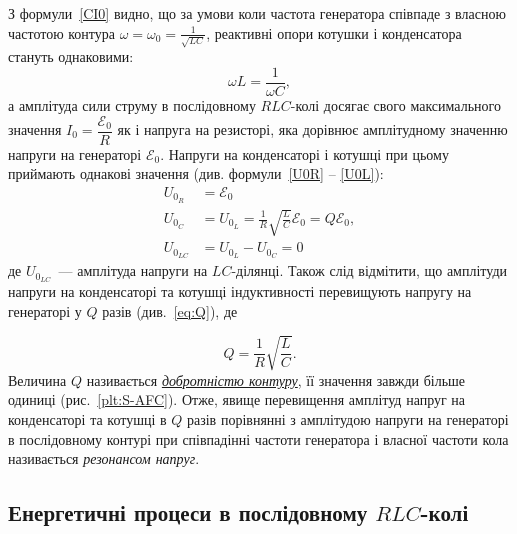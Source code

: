 З формули~\eqref{CI0} видно, що за умови коли частота генератора співпаде з власною частотою контура $\omega = \omega_0 = \frac{1}{\sqrt{LC}}$, реактивні опори котушки і конденсатора стануть однаковими:
\begin{equation}
	\omega L = \frac{1}{\omega C},
\end{equation}
а амплітуда сили струму в послідовному $RLC$-колі досягає свого максимального значення $I_0 = \dfrac{\mathcal{E}_0}{R}$ як і напруга на резисторі, яка дорівнює амплітудному значенню напруги на генераторі $\mathcal{E}_0$. Напруги на конденсаторі і котушці при цьому приймають однакові значення (див. формули~\eqref{U0R} -- \eqref{U0L}):
\begin{align}\label{ULC}
	U_{0_R}    & = \mathcal{E}_0                                                             \\
	U_{0_C}    & = U_{0_L} = \frac{1}{R} \sqrt{\frac{L}{C}} \mathcal{E}_0 = Q \mathcal{E}_0, \label{eq:Q}\\
	U_{0_{LC}} & = U_{0_L} - U_{0_C} = 0 
\end{align}
де $U_{0_{LC}}$~--- амплітуда напруги на $LC$-ділянці. Також слід відмітити, що амплітуди напруги на конденсаторі та котушці індуктивності перевищують напругу на генераторі у $Q$  разів (див.~\eqref{eq:Q}), де

\begin{equation}\label{eq:Qdef}
    Q = \frac{1}{R}\sqrt{\frac{L}{C}}.
\end{equation}
Величина $Q$ називається \href{http://femto.com.ua/articles/part_1/1110.html}{\emph{добротністю контуру}}, її значення завжди більше одиниці (рис.~\ref{plt:S-AFC}). Отже, явище перевищення амплітуд напруг на конденсаторі та котушці в $Q$ разів порівнянні з амплітудою напруги на генераторі в послідовному контурі при співпадінні частоти генератора і власної частоти кола називається \emph{резонансом напруг}. 

%

\subsection{Енергетичні процеси в послідовному $RLC$-колі}

